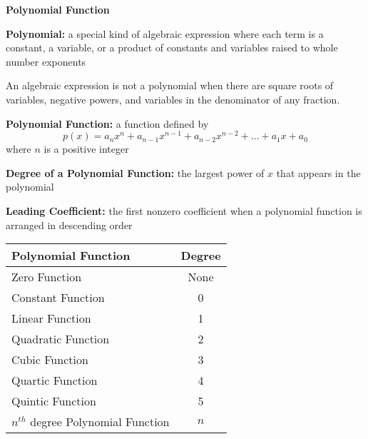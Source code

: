 \begin{center}
\textbf{Polynomial Function  
}
\end{center}

\textbf{Polynomial:} a special kind of algebraic expression where each term is a constant, a variable, or a product of constants and variables raised to whole number exponents 

\vspce

An algebraic expression is not a polynomial when there are square roots of variables, negative powers, and variables in the denominator of any fraction. 

\vspce

\textbf{Polynomial Function:} a function defined by \[p(x) = a_nx^n +  a_{n-1}x^{n-1} + a_{n-2}x^{n-2} + \ldots + a_1x + a_0 \] where $n$ is a positive integer 

\vspce

\textbf{Degree of a Polynomial Function:} the largest power of $x$ that appears in the polynomial 

\vspce 

\textbf{Leading Coefficient:} the first nonzero coefficient when a polynomial function is arranged in descending order

\vspce

\begin{center}


\begin{tabular}{|l|c|}
\hline 
\textbf{ Polynomial Function}& \textbf{ Degree } \\
\hline 
Zero Function & None \\
\hline 
Constant  Function & 0 \\
\hline 
Linear  Function & 1 \\
\hline 
Quadratic  Function & 2 \\
\hline 
Cubic Function & 3 \\
\hline 
Quartic Function & 4 \\
\hline 
Quintic Function & 5 \\
\hline 
$n^{th}$ degree Polynomial  Function & $n$ \\
\hline 
 
\end{tabular}

\end{center} 


